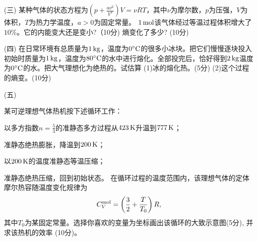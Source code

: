 \documentclass[12pt,CJK]{article}
\begin{document}
  
\item[(三)]{某种气体的状态方程为$\left(p+\frac{a\nu^2}{V^3}\right)V = \nu R T$，其中$\nu$为摩尔数，$p$为压强，$V$为体积，$T$为热力学温度，$a>0$为固定常量。 $1\,\mathrm{mol}$该气体经过等温过程体积增大了$10\%$。它的内能变大还是变小?（10分) 熵变化了多少? (10分)
    \vspace{3.4in}
  }


\item[(四)]{在日常环境有总质量为$1\,\mathrm{kg}$，温度为$0^\circ \mathrm{C}$的很多小冰块。把它们慢慢逐块投入初始时质量为$1\,\mathrm{kg}$，温度为$80^\circ \mathrm{C}$的水中进行熔化。全部投完后，恰好得到$2\,\mathrm{kg}$温度为$0^\circ \mathrm{C}$的水。把大气理想化为绝热的。试估算 (1)冰的熔化热。(5分) (2)这个过程的熵变。(10分)
\vspace{3.5in}
}
  
  
  \item[(五)]{某可逆理想气体热机按下述循环工作：
      \bitem
    \item{以多方指数$n=\frac{5}{3}$的准静态多方过程从$423\,\mathrm{K}$升温到$777\,\mathrm{K}$；}
    \item{准静态绝热膨胀，降温到$200\,\mathrm{K}$；}
    \item{以$200\,\mathrm{K}$的温度准静态等温压缩；}
    \item{准静态绝热压缩，回到初始状态。}      
      \eitem
      在循环过程的温度范围内，该理想气体的定体摩尔热容随温度变化规律为
      $$C_V^{\rm mol} = \left(\frac{3}{2} + \frac{T}{T_0}\right)R,$$
      其中$T_0$为某固定常量。选择你喜欢的变量为坐标画出该循环的大致示意图(5分), 并求该热机的效率 (10分)。
  }  

\eitem


\ech
\end{document}
